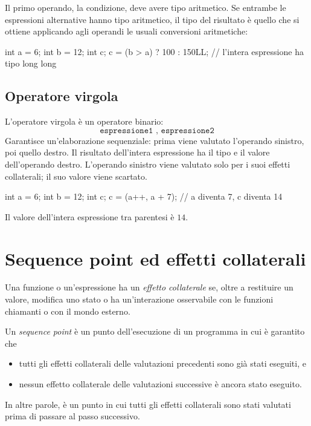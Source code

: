 \documentclass[11pt,a4paper]{article}
\begin{document}
Il primo operando, la condizione, deve avere tipo aritmetico. Se entrambe le espressioni alternative hanno tipo aritmetico, il tipo del risultato è quello che si ottiene applicando agli operandi le usuali conversioni aritmetiche:
\begin{codice}
int a = 6;
int b = 12;
int c;
c = (b > a) ? 100 : 150LL;   // l'intera espressione ha tipo long long
\end{codice}

\subsection{Operatore virgola}

L'operatore virgola è un operatore binario:
\[
\texttt{espressione1 , espressione2}
\]
Garantisce un'elaborazione sequenziale: prima viene valutato l'operando sinistro, poi quello destro. Il risultato dell'intera espressione ha il tipo e il valore dell'operando destro. L'operando sinistro viene valutato solo per i suoi effetti collaterali; il suo valore viene scartato.

\begin{esempio}
\begin{codice}
int a = 6;
int b = 12;
int c;
c = (a++, a + 7);   // a diventa 7, c diventa 14
\end{codice}
Il valore dell'intera espressione tra parentesi è $14$.
\end{esempio}

\section{Sequence point ed effetti collaterali}

Una funzione o un'espressione ha un \emph{effetto collaterale} se, oltre a restituire un valore, modifica uno stato o ha un'interazione osservabile con le funzioni chiamanti o con il mondo esterno.

\begin{definizione}
Un \emph{sequence point} è un punto dell'esecuzione di un programma in cui è garantito che
\begin{itemize}
    \item tutti gli effetti collaterali delle valutazioni precedenti sono già stati eseguiti, e
    \item nessun effetto collaterale delle valutazioni successive è ancora stato eseguito.
\end{itemize}
In altre parole, è un punto in cui tutti gli effetti collaterali sono stati valutati prima di passare al passo successivo.
\end{definizione}
\end{document}
